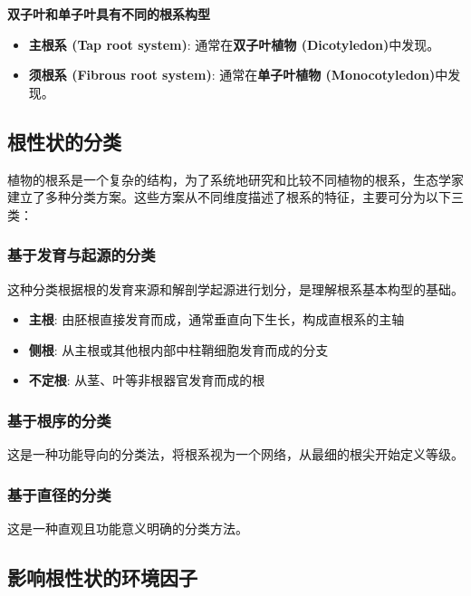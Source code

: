 \documentclass[10.5pt]{config}
\begin{document}
\textbf{双子叶和单子叶具有不同的根系构型}
        \begin{itemize}
            \item \textbf{主根系 (Tap root system)}: 通常在\textbf{双子叶植物 (Dicotyledon)}中发现。
            \item \textbf{须根系 (Fibrous root system)}: 通常在\textbf{单子叶植物 (Monocotyledon)}中发现。
        \end{itemize}


\subsection{根性状的分类}
植物的根系是一个复杂的结构，为了系统地研究和比较不同植物的根系，生态学家建立了多种分类方案。这些方案从不同维度描述了根系的特征，主要可分为以下三类：

\subsubsection{基于发育与起源的分类}

这种分类根据根的发育来源和解剖学起源进行划分，是理解根系基本构型的基础。

\begin{itemize}
    \item \textbf{主根}: 由胚根直接发育而成，通常垂直向下生长，构成直根系的主轴
    \item \textbf{侧根}: 从主根或其他根内部中柱鞘细胞发育而成的分支
    \item \textbf{不定根}: 从茎、叶等非根器官发育而成的根
\end{itemize}

\subsubsection{基于根序的分类}

这是一种功能导向的分类法，将根系视为一个网络，从最细的根尖开始定义等级。

\subsubsection{基于直径的分类}

这是一种直观且功能意义明确的分类方法。

\subsection{影响根性状的环境因子}
\end{document}
